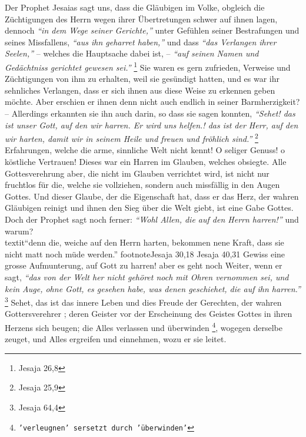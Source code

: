 Der Prophet Jesaias sagt uns, dass die Gläubigen im Volke, obgleich die
Züchtigungen des Herrn wegen ihrer Übertretungen schwer auf ihnen lagen,
dennoch
\textit{"`in dem Wege seiner Gerichte,"'} unter Gefühlen seiner Bestrafungen und
seines Missfallens, \textit{"`aus ihn geharret haben,"'} und dass \textit{"`das
Verlangen ihrer Seelen,"'} -- welches die Hauptsache dabei ist, --
\textit{"`auf seinen Namen und Gedächtniss gerichtet gewesen sei."'}
\footnote{Jesaja 26,8}
Sie waren es gern
zufrieden, Verweise und Züchtigungen von ihm zu erhalten, weil sie gesündigt
hatten, und es war ihr sehnliches Verlangen, dass er sich ihnen aus diese Weise
zu erkennen geben möchte. Aber erschien er ihnen denn
nicht auch endlich in
seiner Barmherzigkeit?  -- Allerdings erkannten sie ihn auch darin, so dass sie
sagen konnten,
\textit{"`Sehet! das ist unser Gott, auf den wir harren. Er wird uns
helfen.! das ist der Herr, auf den wir harten, damit wir in seinem Heile und
freuen und fröhlich sind."'}
\footnote{Jesaja 25,9}
Erfahrungen, welche die arme,
sinnliche Welt nicht kennt!  O seliger Genuss! o köstliche
Vertrauen! Dieses war
ein Harren im Glauben, welches obsiegte. Alle Gottesverehrung aber, die nicht im
Glauben verrichtet wird, ist nicht nur fruchtlos
 für die, welche sie vollziehen,
sondern auch missfällig in den Augen Gottes. Und dieser Glaube, der die
Eigenschaft hat, dass er das Herz, der wahren Gläubigen reinigt und ihnen den
Sieg über die Welt giebt, ist eine Gabe Gottes. Doch
der Prophet sagt noch
ferner:
\textit{"`Wohl Allen, die auf den Herrn harren!"'} und warum?\\textit{"`denn
die, weiche
auf den Herrn harten, bekommen nene Kraft, dass sie nicht matt noch müde
werden."'}
footnote{Jesaja 30,18 Jesaja 40,31}
Gewiss eine grosse Aufmunterung, auf Gott
zu harren! aber es geht noch Weiter, wenn er sagt,
\textit{"`das von der Welt her
nicht gehöret noch mit Ohren vernommen sei, und kein Auge, ohne Gott, es gesehen
habe, was denen geschiehet, die auf ihn harren."'}
\footnote{Jesaja 64,4}
Sehet, das ist das innere Leben und dies Freude der Gerechten, der wahren
Gottersverehrer ;
deren Geister vor der Erscheinung des Geistes Gottes in ihren Herzens sich
beugen; die Alles verlassen und überwinden \footnote{\texttt{'verleugnen' sersetzt
durch 'überwinden'}}, wogegen derselbe zeuget, und Alles
ergreifen und einnehmen, wozu er sie leitet.

